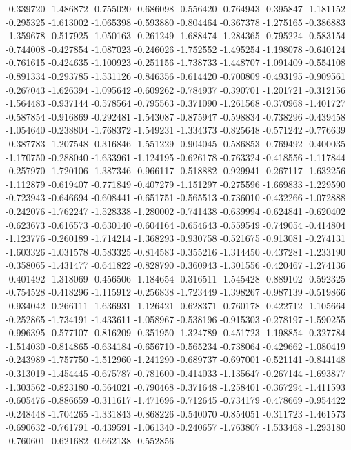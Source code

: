 -0.339720
-1.486872
-0.755020
-0.686098
-0.556420
-0.764943
-0.395847
-1.181152
-0.295325
-1.613002
-1.065398
-0.593880
-0.804464
-0.367378
-1.275165
-0.386883
-1.359678
-0.517925
-1.050163
-0.261249
-1.688474
-1.284365
-0.795224
-0.583154
-0.744008
-0.427854
-1.087023
-0.246026
-1.752552
-1.495254
-1.198078
-0.640124
-0.761615
-0.424635
-1.100923
-0.251156
-1.738733
-1.448707
-1.091409
-0.554108
-0.891334
-0.293785
-1.531126
-0.846356
-0.614420
-0.700809
-0.493195
-0.909561
-0.267043
-1.626394
-1.095642
-0.609262
-0.784937
-0.390701
-1.201721
-0.312156
-1.564483
-0.937144
-0.578564
-0.795563
-0.371090
-1.261568
-0.370968
-1.401727
-0.587854
-0.916869
-0.292481
-1.543087
-0.875947
-0.598834
-0.738296
-0.439458
-1.054640
-0.238804
-1.768372
-1.549231
-1.334373
-0.825648
-0.571242
-0.776639
-0.387783
-1.207548
-0.316846
-1.551229
-0.904045
-0.586853
-0.769492
-0.400035
-1.170750
-0.288040
-1.633961
-1.124195
-0.626178
-0.763324
-0.418556
-1.117844
-0.257970
-1.720106
-1.387346
-0.966117
-0.518882
-0.929941
-0.267117
-1.632256
-1.112879
-0.619407
-0.771849
-0.407279
-1.151297
-0.275596
-1.669833
-1.229590
-0.723943
-0.646694
-0.608441
-0.651751
-0.565513
-0.736010
-0.432266
-1.072888
-0.242076
-1.762247
-1.528338
-1.280002
-0.741438
-0.639994
-0.624841
-0.620402
-0.623673
-0.616573
-0.630140
-0.604164
-0.654643
-0.559549
-0.749054
-0.414804
-1.123776
-0.260189
-1.714214
-1.368293
-0.930758
-0.521675
-0.913081
-0.274131
-1.603326
-1.031578
-0.583325
-0.814583
-0.355216
-1.314450
-0.437281
-1.233190
-0.358065
-1.431477
-0.641822
-0.828790
-0.360943
-1.301556
-0.420467
-1.274136
-0.401492
-1.318069
-0.456506
-1.184654
-0.316511
-1.545428
-0.889102
-0.592325
-0.754528
-0.418296
-1.115912
-0.256838
-1.723449
-1.398267
-0.987139
-0.519866
-0.934042
-0.266111
-1.636931
-1.126421
-0.628371
-0.760178
-0.422712
-1.105664
-0.252865
-1.734191
-1.433611
-1.058967
-0.538196
-0.915303
-0.278197
-1.590255
-0.996395
-0.577107
-0.816209
-0.351950
-1.324789
-0.451723
-1.198854
-0.327784
-1.514030
-0.814865
-0.634184
-0.656710
-0.565234
-0.738064
-0.429662
-1.080419
-0.243989
-1.757750
-1.512960
-1.241290
-0.689737
-0.697001
-0.521141
-0.844148
-0.313019
-1.454445
-0.675787
-0.781600
-0.414033
-1.135647
-0.267144
-1.693877
-1.303562
-0.823180
-0.564021
-0.790468
-0.371648
-1.258401
-0.367294
-1.411593
-0.605476
-0.886659
-0.311617
-1.471696
-0.712645
-0.734179
-0.478669
-0.954422
-0.248448
-1.704265
-1.331843
-0.868226
-0.540070
-0.854051
-0.311723
-1.461573
-0.690632
-0.761791
-0.439591
-1.061340
-0.240657
-1.763807
-1.533468
-1.293180
-0.760601
-0.621682
-0.662138
-0.552856
